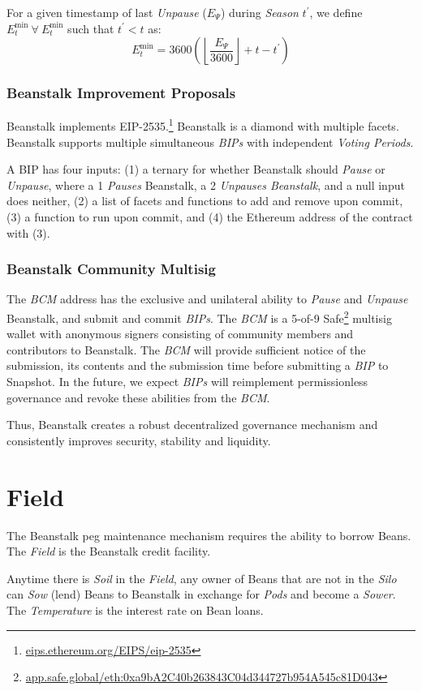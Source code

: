 \documentclass[tikz]{article}
\newcommand{\term}[1]{\textsl{#1}}
\newcommand{\fref}[1]{\footnote{\href{http://#1}{#1}}}
\begin{document}
For a given timestamp of last \term{Unpause} ($E_{\Psi}$) during \term{Season} $t^{'}$, we define $E_{t}^{\text{min}}\ \forall\ E_{t}^{\text{min}}$ such that $t^{'} < t$ as:
$$E_{t}^{\text{min}} = 3600{\left({\left\lfloor\frac{E_{\Psi}}{3600}\right\rfloor} + t - t^{'}\right)}$$

\subsubsection{Beanstalk Improvement Proposals}
Beanstalk implements EIP-2535.\fref{eips.ethereum.org/EIPS/eip-2535} Beanstalk is a diamond with multiple facets. Beanstalk supports multiple simultaneous \term{BIPs} with independent \term{Voting Periods}.

A BIP has four inputs: (1) a ternary for whether Beanstalk should \term{Pause} or \term{Unpause}, where a 1 \term{Pauses} Beanstalk, a 2 \term{Unpauses Beanstalk}, and a null input does neither, (2) a list of facets and functions to add and remove upon commit, (3) a function to run upon commit, and (4) the Ethereum address of the contract with (3).

\subsubsection{Beanstalk Community Multisig}
The \term{BCM} address has the exclusive and unilateral ability to \term{Pause} and \term{Unpause} Beanstalk, and submit and commit \term{BIPs}. The \term{BCM} is a 5-of-9 Safe\fref{app.safe.global/eth:0xa9bA2C40b263843C04d344727b954A545c81D043} multisig wallet with anonymous signers consisting of community members and contributors to Beanstalk. The \term{BCM} will provide sufficient notice of the submission, its contents and the submission time before submitting a \term{BIP} to Snapshot. In the future, we expect \term{BIPs} will reimplement permissionless governance and revoke these abilities from the \term{BCM}.

Thus, Beanstalk creates a robust decentralized governance mechanism and consistently improves security, stability and liquidity.

\section{Field}
The Beanstalk peg maintenance mechanism requires the ability to borrow Beans. The \term{Field} is the Beanstalk credit facility. 

Anytime there is \term{Soil} in the \term{Field}, any owner of Beans that are not in the \term{Silo} can \term{Sow} (lend) Beans to Beanstalk in exchange for \term{Pods} and become a \term{Sower}. The \term{Temperature} is the interest rate on Bean loans.
\end{document}

